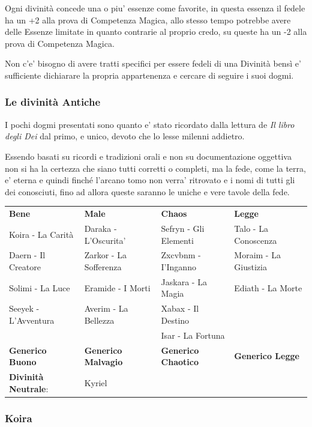 \documentclass[a4paper,11pt,twoside,openany]{book}
\begin{document}
Ogni divinità concede una o piu' essenze come favorite, in questa essenza il fedele ha un +2 alla prova di Competenza Magica, allo stesso tempo potrebbe avere delle Essenze limitate in quanto contrarie al proprio credo, su queste ha un -2 alla prova di Competenza Magica.


Non c'e' bisogno di avere tratti specifici per essere fedeli di una Divinità bensì e' sufficiente dichiarare la propria appartenenza e cercare di seguire i suoi dogmi.

\subsubsection{Le divinità Antiche}

I pochi dogmi presentati sono quanto e' stato ricordato dalla lettura de \textit{Il libro degli Dei} dal primo, e unico, devoto che lo lesse milenni addietro.

Essendo basati su ricordi e tradizioni orali e non su documentazione oggettiva non si ha la certezza che siano tutti corretti o completi, ma la fede, come la terra, e' eterna e quindi finché l'arcano tomo non verra' ritrovato e i nomi di tutti gli dei conosciuti, fino ad allora queste saranno le uniche e vere tavole della fede.

\bigskip

\begin{tabularx}{0.95\textwidth}{XXXX}
\textbf{Bene} & \textbf{Male} & \textbf{Chaos} & \textbf{Legge}\\
Koira - La Carità & Daraka - L'Oscurita' & 	Sefryn - Gli Elementi&	Talo - La Conoscenza\\
Daern - Il Creatore & Zarkor - La Sofferenza & Zxcvbnm - I'Inganno & Moraim - La Giustizia\\
Solimi - La Luce &	Eramide - I Morti & Jaskara - La Magia & Ediath - La Morte\\
Seeyek - L'Avventura & 	Averim - La Bellezza & Xabax - Il Destino \\
&& Isar - La Fortuna \\
\textbf{Generico Buono} & \textbf{Generico Malvagio} & \textbf{Generico Chaotico} & \textbf{Generico Legge}\\
\textbf{Divinità Neutrale}: &Kyriel \\

\end{tabularx}

\pagebreak

\subsubsection{Koira}
\end{document}
